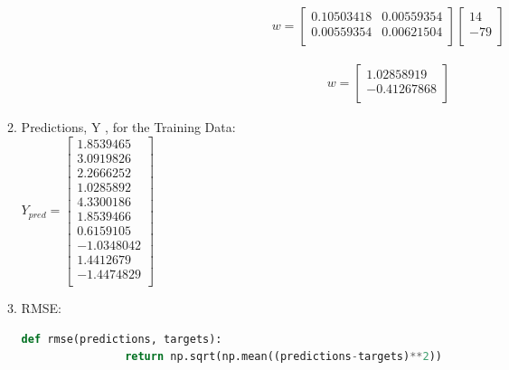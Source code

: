 \documentclass[12pt]{article}
\begin{document}
\begin{enumerate}
\begin{enumerate}
\begin{equation}
	\begin{split}
		w = \begin{bmatrix}
			0.10503418 & 0.00559354\\
			0.00559354 & 0.00621504\\
		\end{bmatrix}\begin{bmatrix}
			14\\
			-79\\
		\end{bmatrix}
	\end{split}
\end{equation}

\begin{equation}
	\begin{split}
		w = \begin{bmatrix}
			1.02858919\\
			-0.41267868\\
		\end{bmatrix}
	\end{split}
\end{equation}



		\begin{comment}
	\newpage
	\end{comment}
	
	\newpage
	
	\item Predictions, Y , for the Training Data:\\
	
	$
		Y_{pred}=
	\begin{bmatrix}
		1.8539465\\
		3.0919826\\	
		2.2666252\\
		1.0285892\\
		4.3300186\\
		1.8539466\\
		0.6159105\\
		-1.0348042\\
		1.4412679\\
		-1.4474829\\
	\end{bmatrix}
	$


	\item RMSE:\\
	
		\begin{lstlisting}[language=Python]
			def rmse(predictions, targets):
				return np.sqrt(np.mean((predictions-targets)**2))
				

\end{lstlisting}
\end{enumerate}
\end{enumerate}
\end{document}
